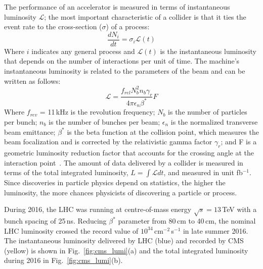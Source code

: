 The performance of an accelerator is measured in terms of instantaneous luminosity $\mathcal{L}$; the most important characteristic of a collider is that it ties the event rate to the cross-section ($\sigma$) of a process:
\begin{equation}
\frac{dN_{i}}{dt} = \sigma_{i} \mathcal{L}(t)
\end{equation}
Where $i$ indicates any general process and $\mathcal{L}(t)$ is the instantaneous luminosity that depends on the number of interactions per unit of time. The machine’s instantaneous luminosity is related to the parameters of the beam and can be written as follows:
\begin{equation}
\mathcal{L} = \frac{f_{rel}N_{b}^{2}n_{b}\gamma_{r}}{4\pi\epsilon_{n}\beta^{\ast}}F
\end{equation}
Where $f_{rev}$ = 11\,kHz is the revolution frequency; $N_{b}$ is the number of particles per bunch; $n_{b}$ is the number of bunches per beam; $\epsilon_{n}$ is the normalized transverse beam emittance; $\beta^{\ast}$ is the beta function at the collision point, which measures the beam focalization and is corrected by the relativistic gamma factor $\gamma_{r}$; and F is a geometric luminosity reduction factor that accounts for the crossing angle at the interaction point~\cite{lumi_formula}. The amount of data delivered by a collider is measured in terms of the total integrated luminosity, $L = \int\mathcal{L}dt$, and measured in unit fb$^{-1}$. Since discoveries in particle physics depend on statistics, the higher the luminosity, the more chances physicists of discovering a particle or process.

During 2016, the LHC was running at centre-of-mass energy $\sqrt{s} = 13$\,TeV with a bunch spacing of 25\,ns. Reducing $\beta^{\ast}$ parameter from 80\,cm to 40\,cm, the nominal LHC luminosity crossed the record value of $10^{34}$\,cm$^{-2}$\,s$^{-1}$ in late summer 2016. The instantaneous luminosity delivered by LHC (blue) and recorded by CMS (yellow) is shown in Fig.~\ref{fig:cms_lumi}(a) and the total integrated luminosity during 2016 in Fig.~\ref{fig:cms_lumi}(b).   


